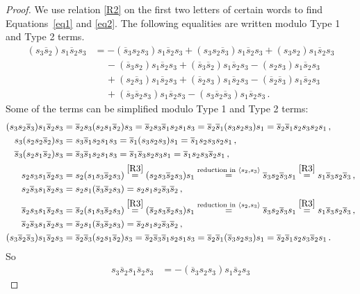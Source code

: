 \documentclass[12pt,reqno]{amsart}
\theoremstyle{definition}
\def\la{\langle}
\def\ra{\rangle}
\def\hs{\overline{s}}
\begin{document}
\begin{proof}
We use relation \eqref{R2} on the first two letters of certain words to find
Equations~\eqref{eq1} and \eqref{eq2}. The following equalities are written
modulo Type 1 and Type 2 terms.
\begin{align*}
(s_3 \hs_2) s_1 \hs_2 s_3 & =  -(\hs_3 s_2 s_3)s_1 \hs_2 s_3 + (s_3 s_2 \hs_3)
s_1 \hs_2 s_3 + (s_3 s_2) s_1 \hs_2 s_3\\
&\phantom{sii} -(\hs_3 s_2) s_1 \hs_2 s_3 + (\hs_3 \hs_2) s_1 \hs_2 s_3
- (s_2 s_3) s_1 \hs_2 s_3\\
&\phantom{sii} + (s_2 \hs_3) s_1 \hs_2 s_3 + (\hs_2 s_3) s_1 \hs_2 s_3
- (\hs_2 \hs_3) s_1 \hs_2 s_3 \\
&\phantom{sii} + (\hs_3 \hs_2 s_3) s_1 \hs_2 s_3 - (s_3 \hs_2 \hs_3) s_1 \hs_2 s_3 \,.
\end{align*}
Some of the terms can be simplified modulo Type 1 and Type 2 terms:
\begin{align*}
  (s_3 s_2 \hs_3) s_1 \hs_2 s_3 & = \hs_2 s_3 (s_2 s_1 \hs_2) s_3
  = \hs_2 s_3 \hs_1 s_2 s_1 s_3 = \hs_2 \hs_1 (s_3 s_2 s_3) s_1
  = \hs_2 \hs_1 s_2 s_3 s_2 s_1\,,
\\
s_3 (s_2 s_2 \hs_2) s_3 & = s_3 \hs_1 s_2 s_1 s_3 = \hs_1 (s_3 s_2 s_3) s_1
= \hs_1 s_2 s_3 s_2 s_1 \,,
\\
\hs_3 (s_2 s_1 \hs_2) s_3 & = \hs_3 \hs_1 s_2 s_1 s_3 = \hs_1 \hs_3 s_2 s_3 s_1
= \hs_1 s_2 s_3 \hs_2 s_1 \,,
\\
s_2 s_3 s_1 \hs_2 s_3 & = s_2 (s_1 s_3 \hs_2 s_3) \overset{\eqref{R3}}{=}
(s_2 s_3 \hs_2 s_3) s_1 \overset{\text{reduction in }\la s_2,s_3\ra}{=}
\hs_3 s_2 \hs_3 s_1 \overset{\eqref{R3}}{=} s_1 \hs_3 s_2 \hs_3\,,
\\
s_2 \hs_3 s_1 \hs_2 s_3 & = s_2 s_1 (\hs_3 \hs_2 s_3) = s_2 s_1 s_2 \hs_3 \hs_2 \,,
\\
\hs_2 s_3 s_1 \hs_2 s_3 & = \hs_2 (s_1 s_3 \hs_2 s_3) \overset{\eqref{R3}}{=}
(\hs_2 s_3 \hs_2 s_3)s_1 \overset{\text{reduction in }\la s_2,s_3\ra}{=}
\hs_3 s_2 \hs_3 s_1 \overset{\eqref{R3}}{=} s_1 \hs_3 s_2 \hs_3 \,,
\\
\hs_2 \hs_3 s_1 \hs_2 s_3 & = \hs_2 s_1 (\hs_3 \hs_2 s_3) = \hs_2 s_1 s_2
\hs_3 \hs_2 \,,
\\
(s_3 \hs_2 \hs_3) s_1 \hs_2 s_3 & = \hs_2 \hs_3(s_2 s_1 \hs_2)s_3 = \hs_2
\hs_3 \hs_1 s_2 s_1 s_3 = \hs_2 \hs_1 (\hs_3 s_2 s_3) s_1
= \hs_2 \hs_1 s_2 s_3 \hs_2 s_1 \,. 
\end{align*}
So
\begin{align*}
  s_3 \hs_2 s_1 \hs_2 s_3&   =   -(\hs_3 s_2 s_3)s_1 \hs_2 s_3

\end{align*}
\end{proof}
\end{document}
